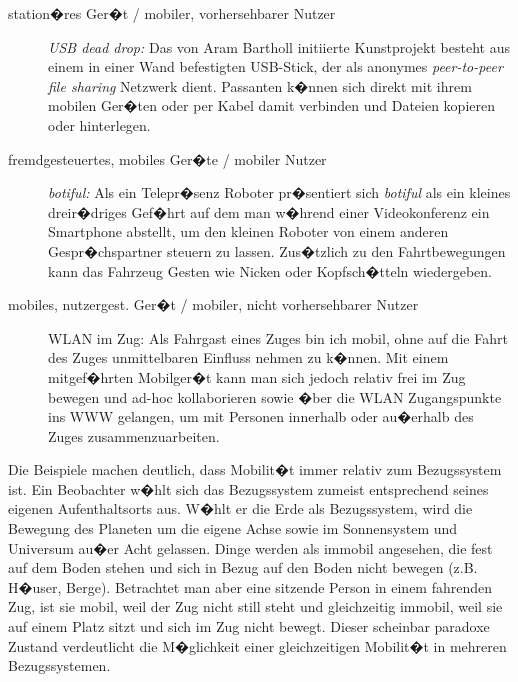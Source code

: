 \begin{description}

	\item[station�res Ger�t / mobiler, vorhersehbarer Nutzer] \textit{USB dead drop:} Das von Aram Bartholl initiierte Kunstprojekt besteht aus einem in einer Wand befestigten USB-Stick, der als anonymes \textit{peer-to-peer file sharing} Netzwerk dient. Passanten k�nnen sich direkt mit ihrem mobilen Ger�ten oder per Kabel damit verbinden und Dateien kopieren oder hinterlegen.
	
	\item[fremdgesteuertes, mobiles Ger�te / mobiler Nutzer] \textit{botiful:} Als ein Telepr�senz Roboter pr�sentiert sich \textit{botiful} als ein kleines dreir�driges Gef�hrt auf dem man w�hrend einer Videokonferenz ein Smartphone abstellt, um den kleinen Roboter von einem anderen Gespr�chspartner steuern zu lassen. Zus�tzlich zu den Fahrtbewegungen kann das Fahrzeug Gesten wie Nicken oder Kopfsch�tteln wiedergeben.

\item[mobiles, nutzergest. Ger�t / mobiler, nicht vorhersehbarer Nutzer] WLAN im Zug: Als Fahrgast eines Zuges bin ich mobil, ohne auf die Fahrt des Zuges unmittelbaren Einfluss nehmen zu k�nnen. Mit einem mitgef�hrten Mobilger�t kann man sich jedoch relativ frei im Zug bewegen und ad-hoc kollaborieren sowie �ber die WLAN Zugangspunkte ins WWW gelangen, um mit Personen innerhalb oder au�erhalb des Zuges zusammenzuarbeiten.
	
\end{description}

Die Beispiele machen deutlich, dass Mobilit�t immer relativ zum Bezugssystem ist. Ein Beobachter w�hlt sich das Bezugssystem zumeist entsprechend seines eigenen Aufenthaltsorts aus. W�hlt er die Erde als Bezugssystem, wird die Bewegung des Planeten um die eigene Achse sowie im Sonnensystem und Universum au�er Acht gelassen. Dinge werden als immobil angesehen, die fest auf dem Boden stehen und sich in Bezug auf den Boden nicht bewegen (z.B. H�user, Berge).
Betrachtet man aber eine sitzende Person in einem fahrenden Zug, ist sie mobil, weil der Zug nicht still steht und gleichzeitig immobil, weil sie auf einem Platz sitzt und sich im Zug nicht bewegt. Dieser scheinbar paradoxe Zustand verdeutlicht die M�glichkeit einer gleichzeitigen Mobilit�t in mehreren Bezugssystemen. 

